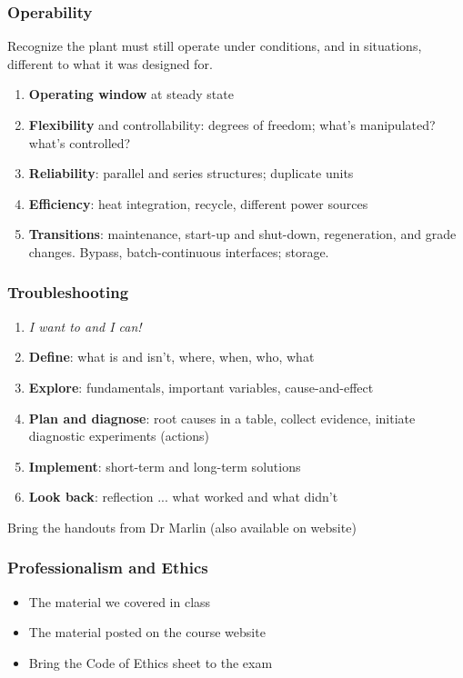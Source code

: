 \begin{frame}\frametitle{Operability}
	\begin{exampleblock}{}
		Recognize the plant must still operate under conditions, and in situations, different to what it was designed for.
	\end{exampleblock}
	\begin{enumerate}
		\item	\textbf{Operating window} at steady state
		\item	\textbf{Flexibility} and controllability: degrees of freedom; what's manipulated? what's controlled?
		\item	\textbf{Reliability}: parallel and series structures; duplicate units
		\item	\textbf{Efficiency}: heat integration, recycle, different power sources
		\item	\textbf{Transitions}: maintenance, start-up and shut-down, regeneration, and grade changes. Bypass, batch-continuous interfaces; storage.
	\end{enumerate}
\end{frame}

\begin{frame}\frametitle{Troubleshooting}
	\begin{enumerate}
		\item	\emph{I want to and I can!}
		\item	\textbf{Define}: what is and isn't, where, when, who, what
		\item	\textbf{Explore}: fundamentals, important variables, cause-and-effect
		\item	\textbf{Plan and diagnose}: root causes in a table, collect evidence, initiate diagnostic experiments (actions)
		\item	\textbf{Implement}: short-term and long-term solutions
		\item	\textbf{Look back}: reflection ... what worked and what didn't
	\end{enumerate}
	\vspace{12pt}
	Bring the handouts from Dr Marlin (also available on website)
\end{frame}

\begin{frame}\frametitle{Professionalism and Ethics}
	\begin{itemize}
		\item	The material we covered in class
		\item	The material posted on the course website
		\item	{\color{red} Bring the Code of Ethics sheet to the exam}
	\end{itemize}
\end{frame}

